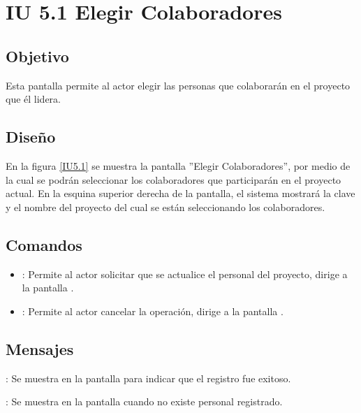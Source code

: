 \section{IU 5.1 Elegir Colaboradores}

\subsection{Objetivo}
	Esta pantalla permite al actor elegir las personas que colaborarán en el proyecto que él lidera.
\subsection{Diseño}
	En la figura \ref{IU5.1} se muestra la pantalla ''Elegir Colaboradores'', por medio de la cual se podrán seleccionar los colaboradores que participarán en el proyecto actual. En la esquina superior derecha de la pantalla, el sistema mostrará la clave y el nombre del proyecto del cual se están seleccionando los colaboradores.

\label{IU5.1}
\subsection{Comandos}
\begin{itemize}
	\item {}: Permite al actor solicitar que se actualice el personal del proyecto, dirige a la pantalla .
	\item {}: Permite al actor cancelar la operación, dirige a la pantalla .
\end{itemize}

\subsection{Mensajes}

\begin{Citemize}
	\item {}: Se muestra en la pantalla  para indicar que el registro fue exitoso.
	\item {}: Se muestra en la pantalla  cuando no existe personal registrado.
\end{Citemize}
